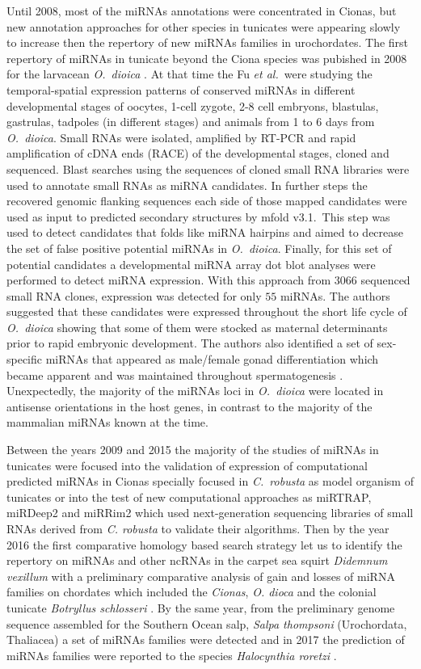 \documentclass[graybox]{svmult}
\begin{document}
Until 2008, most of the miRNAs annotations were concentrated in Cionas, but
new annotation approaches for other species in tunicates were appearing
slowly to increase then the repertory of new miRNAs families in
urochordates. The first repertory of miRNAs in tunicate beyond the Ciona
species was pubished in 2008 for the larvacean \textit{O.\ dioica}
\cite{Fu2008}. At that time the Fu \emph{et al.}\ were studying the
temporal-spatial expression patterns of conserved miRNAs in different
developmental stages of oocytes, 1-cell zygote, 2-8 cell embryons,
blastulas, gastrulas, tadpoles (in different stages) and animals from 1 to
6 days from \textit{O.\ dioica}. Small RNAs were isolated, amplified by
RT-PCR and rapid amplification of cDNA ends (RACE) of the developmental
stages, cloned and sequenced. Blast searches using the sequences of cloned
small RNA libraries were used to annotate small RNAs as miRNA
candidates. In further steps the recovered genomic flanking sequences each
side of those mapped candidates were used as input to predicted secondary
structures by mfold v3.1.\ This step was used to detect candidates that
folds like miRNA hairpins and aimed to decrease the set of false positive
potential miRNAs in \textit{O.\ dioica}. Finally, for this set of potential
candidates a developmental miRNA array dot blot analyses were performed to
detect miRNA expression. With this approach from $3066$ sequenced small RNA
clones, expression was detected for only $55$ miRNAs.  The authors
suggested that these candidates were expressed throughout the short life
cycle of \textit{O.\ dioica} showing that some of them were stocked as
maternal determinants prior to rapid embryonic development. The authors
also identified a set of sex-specific miRNAs that appeared as male/female
gonad differentiation which became apparent and was maintained throughout
spermatogenesis \cite{Fu2008}. Unexpectedly, the majority of the miRNAs
loci in \textit{O.\ dioica} were located in antisense orientations in the
host genes, in contrast to the majority of the mammalian miRNAs known at
the time.

Between the years 2009 and 2015 the majority of the studies of miRNAs in
tunicates were focused into the validation of expression of computational
predicted miRNAs in Cionas specially focused in \textit{C.\ robusta} as
model organism of tunicates or into the test of new computational
approaches as miRTRAP, miRDeep2 and miRRim2 which used next-generation
sequencing libraries of small RNAs derived from \textit{C. robusta} to
validate their algorithms.  Then by the year 2016 the first comparative
homology based search strategy let us to identify the repertory on miRNAs
and other ncRNAs in the carpet sea squirt \textit{Didemnum vexillum} with a
preliminary comparative analysis of gain and losses of miRNA families on
chordates which included the \textit{Cionas}, \textit{O. dioca} and the
colonial tunicate \textit{Botryllus schlosseri}
\cite{Velandia-Huerto2016}. By the same year, from the preliminary genome
sequence assembled for the Southern Ocean salp, \textit{Salpa thompsoni}
(Urochordata, Thaliacea) a set of miRNAs families were detected
\cite{Jue2016} and in 2017 the prediction of miRNAs families were reported
to the species \textit{Halocynthia roretzi} \cite{Wang2017}.
\end{document}
